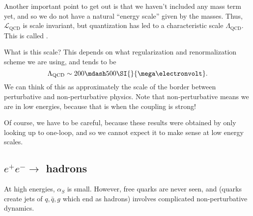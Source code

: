 \documentclass[a4paper]{article}
\begin{document}
Another important point to get out is that we haven't included any mass term yet, and so we do not have a natural ``energy scale'' given by the masses. Thus, $\mathcal{L}_{\mathrm{QCD}}$ is scale invariant, but quantization has led to a characteristic scale $\Lambda_{\mathrm{QCD}}$. This is called .

What is this scale? This depends on what regularization and renormalization scheme we are using, and tends to be
\[
  \Lambda_{\mathrm{QCD}} \sim 200\mdash 500\SI{}{\mega\electronvolt}.
\]
We can think of this as approximately the scale of the border between perturbative and non-perturbative physics. Note that non-perturbative means we are in low energies, because that is when the coupling is strong!

Of course, we have to be careful, because these results were obtained by only looking up to one-loop, and so we cannot expect it to make sense at low energy scales.

\subsection{\texorpdfstring{$e^+ e^- \to $ hadrons}{e+e- -> hadrons}}
At high energies, $\alpha_S$ is small. However, free quarks are never seen, and  (quarks create jets of $q, \bar{q}, g$ which end as hadrons) involves complicated non-perturbative dynamics.
\end{document}

